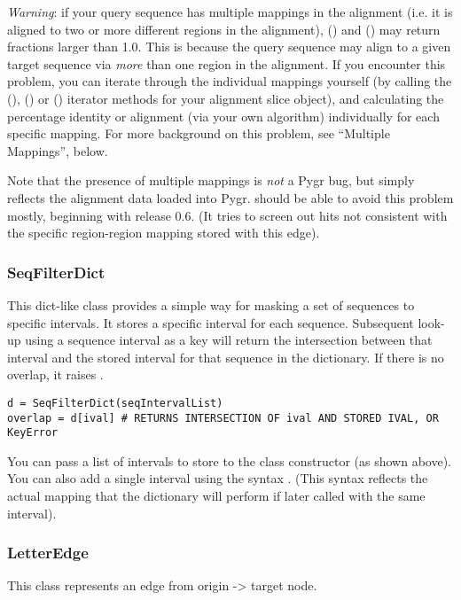 \documentclass{howto}
\begin{document}
{\em Warning}: if your query sequence has multiple mappings in the alignment
(i.e. it is aligned to two or more different regions in the alignment),
() and () may return fractions larger
than 1.0.  This is because the query sequence may align to a given
target sequence via {\em more} than one region in the alignment.  If you
encounter this problem, you can iterate through the individual mappings
yourself (by calling the (), () or
() iterator methods for your alignment slice object), 
and calculating the percentage identity or alignment (via your own algorithm)
individually for each specific mapping.  For more
background on this problem, see ``Multiple Mappings'', below.

Note that the presence of multiple mappings is {\em not} a Pygr bug,
but simply reflects the alignment data loaded into Pygr.  
should be able to avoid this problem mostly, beginning with release 0.6.
(It tries to screen out hits not consistent with the specific region-region
mapping stored with this edge).

\subsubsection{SeqFilterDict}
This dict-like class provides a simple way for masking a set of sequences
to specific intervals.  It stores a specific interval for each
sequence.  Subsequent look-up using a sequence interval as a key will
return the intersection between that interval and the stored interval
for that sequence in the dictionary.  If there is no overlap, it
raises .

\begin{verbatim}
d = SeqFilterDict(seqIntervalList)
overlap = d[ival] # RETURNS INTERSECTION OF ival AND STORED IVAL, OR KeyError
\end{verbatim}

You can pass a list of intervals to store to the class constructor (as 
shown above).  You can also add a single interval using the syntax
.  (This syntax reflects the actual
mapping that the dictionary will perform if later called with the
same interval).

\subsubsection{LetterEdge}
This class represents an edge from origin -> target node.
\end{document}
